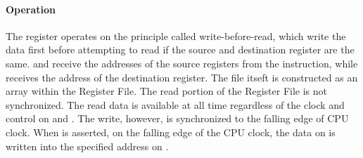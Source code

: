 \begin{table}[!h]
    \centering
    \caption{Input/Output of Register File}
    \label{table:io_rf}
\end{table}

\paragraph*{Operation}
The register operates on the principle called write-before-read, which write the data first before attempting to read if the source and destination register are the same.
 and  receive the addresses of the source registers from the instruction, while  receives the address of the destination register.
The file itseft is constructed as an array within the Register File. The read portion of the Register File is not synchronized.
The read data is available at all time regardless of the clock and control on  and .
The write, however, is synchronized to the falling edge of CPU clock.
When  is asserted, on the falling edge of the CPU clock, the data on  is written into the specified address on .

